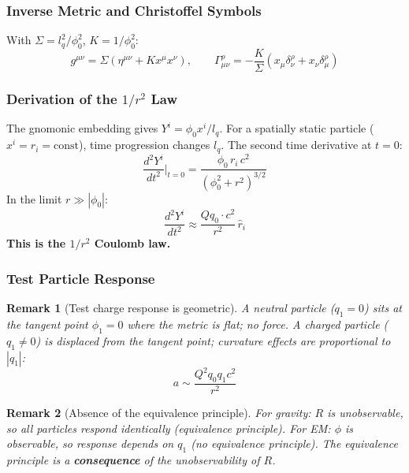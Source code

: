 \documentclass[12pt,a4paper]{article}
\newtheorem*{remark}{Remark}
\begin{document}
\subsubsection{Inverse Metric and Christoffel Symbols}

With $\Sigma = l_q^2/\phi_0^2$, $K = 1/\phi_0^2$:
\begin{equation}
g^{\mu\nu} = \Sigma(\eta^{\mu\nu} + Kx^\mu x^\nu), \qquad \Gamma^\rho_{\mu\nu} = -\frac{K}{\Sigma}(x_\mu \delta^\rho_\nu + x_\nu \delta^\rho_\mu) \tag{8.2--8.3}
\end{equation}

\subsubsection{Derivation of the $1/r^2$ Law}

The gnomonic embedding gives $Y^i = \phi_0 x^i / l_q$. For a spatially static particle ($x^i = r_i = \text{const}$), time progression changes $l_q$. The second time derivative at $t=0$:
\begin{equation}
\frac{d^2 Y^i}{dt^2}\bigg|_{t=0} = \frac{\phi_0\, r_i\, c^2}{(\phi_0^2 + r^2)^{3/2}} \tag{8.7}
\end{equation}
In the limit $r \gg |\phi_0|$:
\begin{equation}
\boxed{\frac{d^2 Y^i}{dt^2} \approx \frac{Qq_0 \cdot c^2}{r^2}\,\hat{r}_i} \tag{8.8}
\end{equation}
\textbf{This is the $1/r^2$ Coulomb law.}

\subsubsection{Test Particle Response}

\begin{remark}[Test charge response is geometric]
A neutral particle ($q_1 = 0$) sits at the tangent point $\phi_1 = 0$ where the metric is flat; no force. A charged particle ($q_1 \neq 0$) is displaced from the tangent point; curvature effects are proportional to $|q_1|$:
\begin{equation}
a \sim \frac{Q^2 q_0 q_1 c^2}{r^2} \tag{8.9}
\end{equation}
\end{remark}

\begin{remark}[Absence of the equivalence principle]
For gravity: $R$ is unobservable, so all particles respond identically (equivalence principle). For EM: $\phi$ is observable, so response depends on $q_1$ (no equivalence principle). The equivalence principle is a \textbf{consequence} of the unobservability of $R$.
\end{remark}
\end{document}

